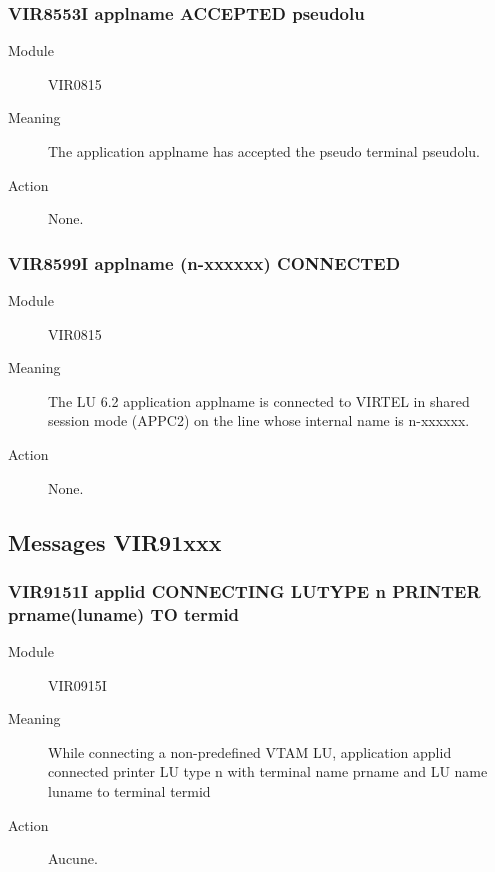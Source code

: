 \documentclass[letterpaper,10pt,english]{sphinxmanual}
\begin{document}
\subsubsection{VIR8553I applname ACCEPTED pseudolu}
\label{\detokenize{messages:vir8553i-applname-accepted-pseudolu}}\begin{description}
\item[{Module}] \leavevmode
VIR0815

\item[{Meaning}] \leavevmode
The application applname has accepted the pseudo terminal pseudolu.

\item[{Action}] \leavevmode
None.

\end{description}


\subsubsection{VIR8599I applname (n-xxxxxx) CONNECTED}
\label{\detokenize{messages:vir8599i-applname-n-xxxxxx-connected}}\begin{description}
\item[{Module}] \leavevmode
VIR0815

\item[{Meaning}] \leavevmode
The LU 6.2 application applname is connected to VIRTEL in shared session mode (APPC2) on the line whose internal name is n-xxxxxx.

\item[{Action}] \leavevmode
None.

\end{description}


\subsection{Messages VIR91xxx}
\label{\detokenize{messages:messages-vir91xxx}}

\subsubsection{VIR9151I applid CONNECTING LUTYPE n PRINTER prname(luname) TO termid}
\label{\detokenize{messages:vir9151i-applid-connecting-lutype-n-printer-prname-luname-to-termid}}\begin{description}
\item[{Module}] \leavevmode
VIR0915I

\item[{Meaning}] \leavevmode
While connecting a non-predefined VTAM LU, application applid connected printer LU type n with terminal name prname and LU name luname to terminal termid

\item[{Action}] \leavevmode
Aucune.

\end{description}
\end{document}
